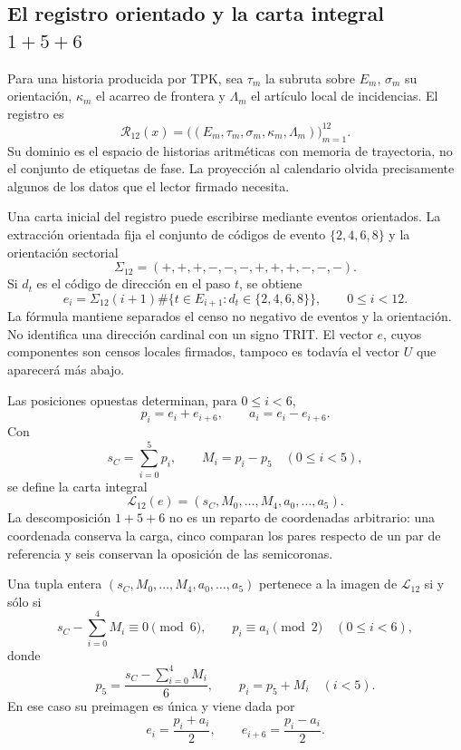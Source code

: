 \subsection{El registro orientado y la carta integral \texorpdfstring{\(1+5+6\)}{1+5+6}}
\label{x_reciprocidad:subsec:k-registro-integral}

Para una historia producida por TPK, sea \(\tau_m\) la subruta sobre
\(E_m\), \(\sigma_m\) su orientación, \(\kappa_m\) el acarreo de
frontera y \(\Lambda_m\) el artículo local de incidencias. El registro es
\[
 \mathcal R_{12}(x)=
 \bigl((E_m,\tau_m,\sigma_m,\kappa_m,\Lambda_m)\bigr)_{m=1}^{12}.
\]
Su dominio es el espacio de historias aritméticas con memoria de trayectoria, no el conjunto de
etiquetas de fase. La proyección al calendario olvida precisamente algunos
de los datos que el lector firmado necesita.

Una carta inicial del registro puede escribirse mediante eventos
orientados. La extracción orientada fija el conjunto de códigos de evento
\(\{2,4,6,8\}\) y la orientación sectorial
\[
 \Sigma_{12}=(+,+,+,-,-,-,+,+,+,-,-,-).
\]
Si \(d_t\) es el código de dirección en el paso \(t\), se obtiene
\[
 e_i=\Sigma_{12}(i+1)
 \#\{t\in E_{i+1}:d_t\in\{2,4,6,8\}\},
 \qquad0\leq i<12.
\]
La fórmula mantiene separados el censo no negativo de eventos y la
orientación. No identifica una dirección cardinal con un signo TRIT. El
vector \(e\), cuyos componentes son censos locales firmados, tampoco es
todavía el vector \(U\) que aparecerá más abajo.

Las posiciones opuestas determinan, para \(0\leq i<6\),
\[
 p_i=e_i+e_{i+6},\qquad a_i=e_i-e_{i+6}.
\]
Con
\[
 s_C=\sum_{i=0}^{5}p_i,\qquad M_i=p_i-p_5\quad(0\leq i<5),
\]
se define la carta integral
\[
 \mathcal L_{12}(e)
 =(s_C,M_0,\ldots,M_4,a_0,\ldots,a_5).
\]
La descomposición \(1+5+6\) no es un reparto de coordenadas arbitrario:
una coordenada conserva la carga, cinco comparan los pares respecto de un
par de referencia y seis conservan la oposición de las semicoronas.

\begin{lemma}
\label{x_reciprocidad:lem:k-carta-integral}
Una tupla entera \((s_C,M_0,\ldots,M_4,a_0,\ldots,a_5)\) pertenece a la
imagen de \(\mathcal L_{12}\) si y sólo si
\[
 s_C-\sum_{i=0}^{4}M_i\equiv0\pmod6,
 \qquad p_i\equiv a_i\pmod2\quad(0\leq i<6),
\]
donde
\[
 p_5=\frac{s_C-\sum_{i=0}^{4}M_i}{6},\qquad p_i=p_5+M_i\quad(i<5).
\]
En ese caso su preimagen es única y viene dada por
\[
 e_i=\frac{p_i+a_i}{2},\qquad e_{i+6}=\frac{p_i-a_i}{2}.
\]
\end{lemma}


